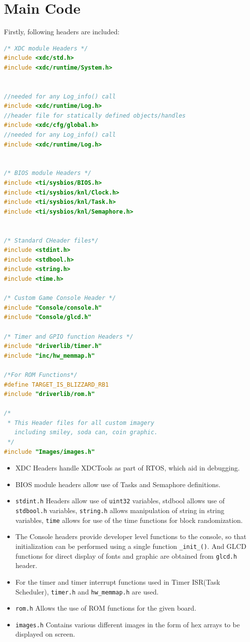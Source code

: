 \documentclass{article}
\begin{document}
\section{Main Code}
\qquad Firstly, following headers are included:
  \begin{lstlisting}[basicstyle = \small, language = C]
/* XDC module Headers */
#include <xdc/std.h>
#include <xdc/runtime/System.h>


//needed for any Log_info() call
#include <xdc/runtime/Log.h>
//header file for statically defined objects/handles
#include <xdc/cfg/global.h>
//needed for any Log_info() call
#include <xdc/runtime/Log.h>


/* BIOS module Headers */
#include <ti/sysbios/BIOS.h>
#include <ti/sysbios/knl/Clock.h>
#include <ti/sysbios/knl/Task.h>
#include <ti/sysbios/knl/Semaphore.h>


/* Standard CHeader files*/
#include <stdint.h>
#include <stdbool.h>
#include <string.h>
#include <time.h>

/* Custom Game Console Header */
#include "Console/console.h"
#include "Console/glcd.h"

/* Timer and GPIO function Headers */
#include "driverlib/timer.h"
#include "inc/hw_memmap.h"

/*For ROM Functions*/
#define TARGET_IS_BLIZZARD_RB1
#include "driverlib/rom.h"

/*
 * This Header files for all custom imagery 
   including smiley, soda can, coin graphic.
 */
#include "Images/images.h"
  \end{lstlisting}
\begin{itemize}
  \item XDC Headers handle XDCTools as part of RTOS, which aid in debugging.
  \item BIOS module headers allow use of Tasks and Semaphore definitions.
  \item \texttt{stdint.h} Headers allow use of \texttt{uint32} variables, stdbool allows use of \texttt{stdbool.h} variables, \texttt{string.h} allows manipulation of string in string variables, \texttt{time} allows for use of the time functions for block randomization.
  \item The Console headers provide developer level functions to the console, so that initialization can be performed using a single function \texttt{\_init\_()}. And GLCD functions for direct display of fonts and graphic are obtained from \texttt{glcd.h} header.
  \item For the timer and timer interrupt functions used in Timer ISR(Task Scheduler), \texttt{timer.h} and \texttt{hw\_memmap.h} are used.
  \item \texttt{rom.h} Allows the use of ROM functions for the given board.
  \item \texttt{images.h} Contains various different images in the form of hex arrays to be displayed on screen.
\end{itemize}
\end{document}
